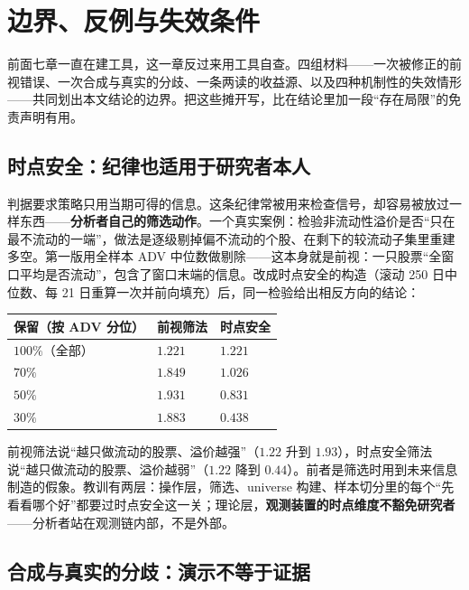\section{边界、反例与失效条件}\label{sec:limits}

前面七章一直在建工具，这一章反过来用工具自查。四组材料——一次被修正的前视错误、一次合成与真实的分歧、一条两读的收益源、以及四种机制性的失效情形——共同划出本文结论的边界。把这些摊开写，比在结论里加一段“存在局限”的免责声明有用。

\subsection{时点安全：纪律也适用于研究者本人}

判据要求策略只用当期可得的信息。这条纪律常被用来检查信号，却容易被放过一样东西——\textbf{分析者自己的筛选动作}。一个真实案例：检验非流动性溢价是否“只在最不流动的一端”，做法是逐级剔掉偏不流动的个股、在剩下的较流动子集里重建多空。第一版用全样本 ADV 中位数做剔除——这本身就是前视：一只股票“全窗口平均是否流动”，包含了窗口末端的信息。改成时点安全的构造（滚动 250 日中位数、每 21 日重算一次并前向填充）后，同一检验给出相反方向的结论：

\begin{center}
\begin{tabular}{@{}>{\raggedright\arraybackslash}p{3.0cm}>{\raggedright\arraybackslash}p{4.2cm}>{\raggedright\arraybackslash}p{4.2cm}@{}}
\toprule
保留（按 ADV 分位） & 前视筛法 & 时点安全 \\
\midrule
$100\%$（全部） & $1.221$ & $1.221$ \\
$70\%$ & $1.849$ & $1.026$ \\
$50\%$ & $1.931$ & $0.831$ \\
$30\%$ & $1.883$ & $0.438$ \\
\bottomrule
\end{tabular}
\end{center}

前视筛法说“越只做流动的股票、溢价越强”（$1.22$ 升到 $1.93$），时点安全筛法说“越只做流动的股票、溢价越弱”（$1.22$ 降到 $0.44$）。前者是筛选时用到未来信息制造的假象。教训有两层：操作层，筛选、universe 构建、样本切分里的每个“先看看哪个好”都要过时点安全这一关；理论层，\textbf{观测装置的时点维度不豁免研究者}——分析者站在观测链内部，不是外部。

\subsection{合成与真实的分歧：演示不等于证据}

